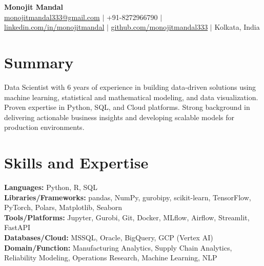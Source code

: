 \documentclass[a4paper,10pt]{article}
\begin{document}
\begin{center}
    {\LARGE \textbf{Monojit Mandal}}\\
    \href{mailto:monojitmandal333@gmail.com}{monojitmandal333@gmail.com} $|$ +91-8272966790 $|$ 
    \href{https://www.linkedin.com/in/monojitmandal/}{linkedin.com/in/monojitmandal} $|$ 
    \href{https://github.com/monojitmandal333}{github.com/monojitmandal333} $|$ Kolkata, India
\end{center}

\section*{Summary}
Data Scientist with 6 years of experience in building data-driven solutions using machine learning, statistical and mathematical modeling, and data visualization. Proven expertise in Python, SQL, and Cloud platforms. Strong background in delivering actionable business insights and developing scalable models for production environments.

\section*{Skills and Expertise}
\textbf{Languages:} Python, R, SQL \\
\textbf{Libraries/Frameworks:} pandas, NumPy, gurobipy, scikit-learn, TensorFlow, PyTorch, Polars, Matplotlib, Seaborn \\
\textbf{Tools/Platforms:} Jupyter, Gurobi, Git, Docker, MLflow, Airflow, Streamlit, FastAPI \\
\textbf{Databases/Cloud:} MSSQL, Oracle, BigQuery, GCP (Vertex AI)\\
\textbf{Domain/Function:} Manufacturing Analytics, Supply Chain Analytics, Reliability Modeling, Operations Research, Machine Learning, NLP

\end{document}
